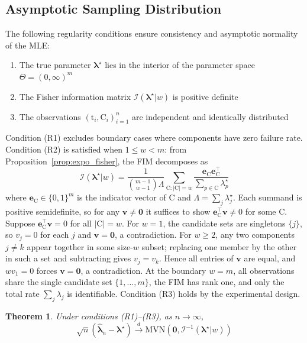 \documentclass[12pt]{article}
\newcommand{\RV}[1]{\mathrm{#1}}
\newcommand{\cand}{\RV{C}}         %
\newcommand{\ti}{\mathrm{t}}       %
\newcommand{\tparam}[1]{{#1}^{\star}}  %
\newcommand{\expomle}{\boldsymbol{\hat{\lambda}}_n}
\newcommand{\infomatrx}{\mathcal{I}}
\newcommand{\mvn}{\mathrm{MVN}}
\renewcommand{\vec}[1]{\boldsymbol{#1}}
\newtheorem{theorem}{Theorem}[section]
\theoremstyle{definition}
\theoremstyle{remark}
\begin{document}
\subsection{Asymptotic Sampling Distribution}

The following regularity conditions ensure consistency and asymptotic normality of the MLE:
\begin{enumerate}
\item[(R1)] The true parameter $\tparam{\vec{\lambda}}$ lies in the interior of the parameter space $\Theta = (0,\infty)^m$
\item[(R2)] The Fisher information matrix $\infomatrx(\tparam{\vec{\lambda}} | w)$ is positive definite
\item[(R3)] The observations $(\ti_i, \cand_i)_{i=1}^n$ are independent and identically distributed
\end{enumerate}

Condition (R1) excludes boundary cases where components have zero failure rate. Condition (R2) is satisfied when $1 \leq w < m$: from Proposition~\ref{prop:expo_fisher}, the FIM decomposes as
\begin{equation}
\infomatrx(\tparam{\vec{\lambda}} | w) = \frac{1}{\binom{m-1}{w-1}\Lambda} \sum_{\cand: |\cand|=w} \frac{\vec{e}_{\cand}\vec{e}_{\cand}^\top}{\sum_{p \in \cand} \tparam{\lambda}_p}
\end{equation}
where $\vec{e}_{\cand} \in \{0,1\}^m$ is the indicator vector of $\cand$ and $\Lambda = \sum_j \tparam{\lambda}_j$. Each summand is positive semidefinite, so for any $\vec{v} \neq \vec{0}$ it suffices to show $\vec{e}_{\cand}^\top \vec{v} \neq 0$ for some $\cand$. Suppose $\vec{e}_{\cand}^\top \vec{v} = 0$ for all $|\cand| = w$. For $w = 1$, the candidate sets are singletons $\{j\}$, so $v_j = 0$ for each $j$ and $\vec{v} = \vec{0}$, a contradiction. For $w \geq 2$, any two components $j \neq k$ appear together in some size-$w$ subset; replacing one member by the other in such a set and subtracting gives $v_j = v_k$. Hence all entries of $\vec{v}$ are equal, and $w v_1 = 0$ forces $\vec{v} = \vec{0}$, a contradiction. At the boundary $w = m$, all observations share the single candidate set $\{1,\ldots,m\}$, the FIM has rank one, and only the total rate $\sum_j \lambda_j$ is identifiable. Condition (R3) holds by the experimental design.

\begin{theorem}
\label{thm:asymptotic_normal}
Under conditions (R1)--(R3), as $n \to \infty$,
\begin{equation}
\sqrt{n}(\expomle - \tparam{\vec{\lambda}}) \xrightarrow{d} \mvn\left(\vec{0}, \infomatrx^{-1}(\tparam{\vec{\lambda}} | w)\right)
\end{equation}
\end{theorem}
\end{document}
